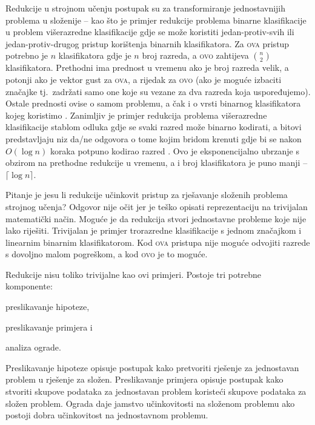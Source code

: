 Redukcije u strojnom učenju postupak su za transformiranje jednostavnijih
problema u složenije -- kao što je primjer redukcije problema binarne
klasifikacije u problem višerazredne klasifikacije gdje se može koristiti
jedan-protiv-svih  ili jedan-protiv-drugog
 pristup korištenja binarnih klasifikatora. Za
\textsc{ova} pristup potrebno je $n$ klasifikatora gdje je $n$ broj razreda, a
\textsc{ovo} zahtijeva $\binom{n}{2}$ klasifikatora. Prethodni ima prednost u
vremenu ako je broj razreda velik, a potonji ako je vektor gust za \textsc{ova},
a rijedak za \textsc{ovo} (ako je moguće izbaciti značajke tj.~zadržati samo one
koje su vezane za dva razreda koja uspoređujemo). Ostale prednosti ovise o samom
problemu, a čak i o vrsti binarnog klasifikatora kojeg koristimo
\citep{milgram2006one}. Zanimljiv je primjer redukcija problema višerazredne
klasifikacije stablom odluka  gdje se svaki razred može
binarno kodirati, a bitovi predstavljaju niz da/ne odgovora o tome kojim bridom
krenuti gdje bi se nakon $O(\log n)$ koraka potpuno kodirao razred
\citep{beygelzimer2009error, daume2016one}. Ovo je eksponencijalno ubrzanje s
obzirom na prethodne redukcije u vremenu, a i broj klasifikatora je puno manji -- $\lceil \log n \rceil$.

Pitanje je jesu li redukcije učinkovit pristup za rješavanje složenih problema
strojnog učenja? Odgovor nije očit jer je teško opisati reprezentaciju na
trivijalan matematički način. Moguće je da redukcija stvori jednostavne probleme
koje nije lako riješiti. Trivijalan je primjer trorazredne klasifikacije s
jednom značajkom i linearnim binarnim klasifikatorom. Kod \textsc{ova} pristupa
nije moguće odvojiti razrede s dovoljno malom pogreškom, a kod \textsc{ovo} je
to moguće.

Redukcije nisu toliko trivijalne kao ovi primjeri. Postoje tri potrebne
komponente:
\begin{inlinelist}
  \item preslikavanje hipoteze,
  \item preslikavanje primjera i
  \item analiza ograde.
\end{inlinelist}
Preslikavanje hipoteze opisuje postupak kako pretvoriti rješenje za jednostavan
problem u rješenje za složen. Preslikavanje primjera opisuje postupak kako
stvoriti skupove podataka za jednostavan problem koristeći skupove podataka za
složen problem. Ograda daje jamstvo učinkovitosti na složenom problemu ako postoji
dobra učinkovitost na jednostavnom problemu.

